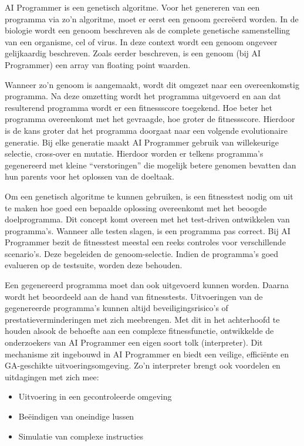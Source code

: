 AI Programmer is een genetisch algoritme. Voor het genereren van een programma via zo'n algoritme, moet er eerst een genoom gecreëerd worden. In de biologie wordt een genoom beschreven als de complete genetische samenstelling van een organisme, cel of virus. In deze context wordt een genoom ongeveer gelijkaardig beschreven. Zoals eerder beschreven, is een genoom (bij AI Programmer) een array van floating point waarden. 

Wanneer zo’n genoom is aangemaakt, wordt dit omgezet naar een overeenkomstig programma. Na deze omzetting wordt het programma uitgevoerd en aan dat resulterend programma wordt er een fitnessscore toegekend. Hoe beter het programma overeenkomt met het gevraagde, hoe groter de fitnessscore. Hierdoor is de kans groter dat het programma doorgaat naar een volgende evolutionaire generatie. Bij elke generatie maakt AI Programmer gebruik van willekeurige selectie, cross-over en mutatie. Hierdoor worden er telkens programma’s gegenereerd met kleine “verstoringen” die mogelijk betere genomen bevatten dan hun parents voor het oplossen van de doeltaak.

Om een genetisch algoritme te kunnen gebruiken, is een fitnesstest nodig om uit te maken hoe  goed een bepaalde oplossing overeenkomt met het beoogde doelprogramma. Dit concept komt overeen met het test-driven ontwikkelen van programma’s. Wanneer alle testen slagen, is een programma pas correct. Bij AI Programmer bezit de fitnesstest meestal een reeks controles voor verschillende scenario’s. Deze begeleiden de genoom-selectie. Indien de programma’s goed evalueren op de testsuite, worden deze behouden.

Een gegenereerd programma moet dan ook uitgevoerd kunnen worden. Daarna wordt het beoordeeld aan de hand van fitnesstests. Uitvoeringen van de gegenereerde programma’s kunnen altijd beveiligingsrisico’s of prestatieverminderingen met zich meebrengen. Met dit in het achterhoofd te houden alsook de behoefte aan een complexe fitnessfunctie, ontwikkelde de onderzoekers van AI Programmer een eigen soort tolk (interpreter). Dit mechanisme zit ingebouwd in AI Programmer en biedt een veilige, efficiënte en GA-geschikte uitvoeringsomgeving. Zo’n interpreter brengt ook voordelen en uitdagingen met zich mee:

\begin{itemize}
	\item Uitvoering in een gecontroleerde omgeving
	\item Beëindigen van oneindige lussen
	\item Simulatie van complexe instructies
\end{itemize}

